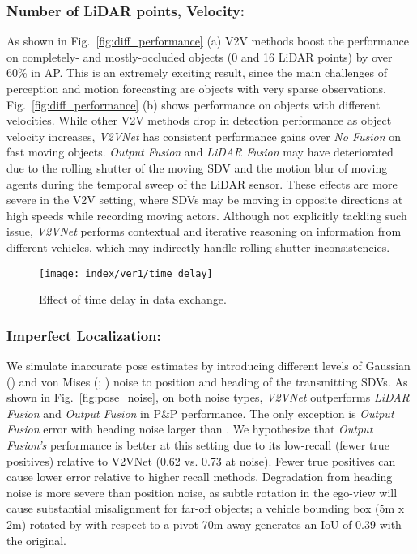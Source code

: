 \documentclass[runningheads]{llncs}
\newcommand{\pnp}{P\&P}
\newcommand{\figref}{Fig.~\ref}
\begin{document}
\subsubsection{Number of LiDAR points,  Velocity:}
As shown in  \figref{fig:diff_performance} (a) V2V methods boost the performance
on completely- and mostly-occluded objects (0 and 16 LiDAR points) by over 60\% in AP.
This is an extremely exciting result, since the main challenges of
perception and motion forecasting
are objects with very sparse observations.
 \figref{fig:diff_performance} (b) shows  performance on objects with different velocities.
While other V2V methods drop in detection performance as object velocity increases, \textit{V2VNet} has consistent performance gains over \textit{No Fusion} on fast moving objects.
\textit{Output Fusion} and \textit{LiDAR Fusion} may have deteriorated due to the rolling shutter of the moving SDV and the motion blur of moving agents during the temporal sweep of the LiDAR sensor.
These effects are more severe in the V2V setting, where SDVs may be moving in opposite directions at high speeds while recording moving actors.
Although not explicitly tackling such issue, \textit{V2VNet} performs contextual and iterative reasoning on information from different vehicles, which may indirectly handle   rolling shutter inconsistencies.

\begin{figure}[t]
  \centering
  \texttt{[image: index/ver1/time\_delay]}
\caption{Effect of time delay in data exchange.}
  \label{fig:time_delay}
\end{figure}

\subsubsection{Imperfect Localization:}
 We simulate inaccurate pose estimates by introducing different levels of Gaussian () and von Mises (; ) noise to position and heading of the transmitting SDVs. 
As shown in \figref{fig:pose_noise}, on both noise types, \textit{V2VNet} outperforms \textit{LiDAR Fusion} and \textit{Output Fusion} in
\pnp{}
performance. The only exception is \textit{Output Fusion}  error with heading noise larger than . We hypothesize that \textit{Output Fusion's} performance is better at this setting due to its low-recall (fewer true positives) relative to V2VNet (0.62 vs. 0.73 at  noise).
Fewer true positives can cause lower  error relative to 
higher recall methods.
Degradation from heading noise is more severe than position noise, as subtle rotation in the 
ego-view
will cause substantial misalignment for far-off objects;
a vehicle bounding box (5m x 2m) rotated by  with respect to a pivot 70m away generates an IoU of 0.39 with the original.
\end{document}
